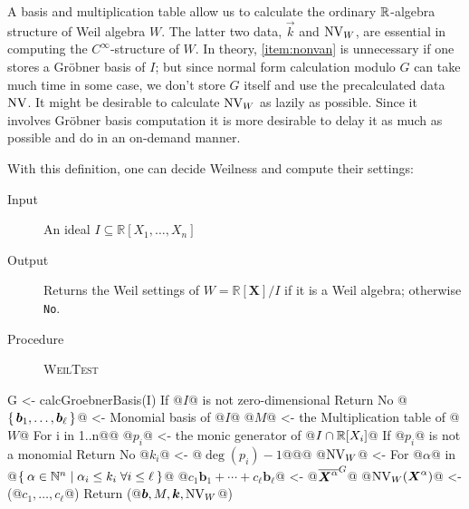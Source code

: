A basis and multiplication table allow us to calculate the ordinary $\mathbb{R}$-algebra structure of Weil algebra $W$.
The latter two data, $\vec{k}$ and $\operatorname{NV}_W$, are essential in computing the $C^\infty$-structure of $W$.
In theory, \ref{item:nonvan} is unnecessary if one stores a Gr\"{o}bner basis of $I$;
but since normal form calculation modulo $G$ can take much time in some case, we don't store $G$ itself and use the precalculated data $\operatorname{NV}$.
It might be desirable to calculate $\operatorname{NV}_W$ as lazily as possible.
Since it involves Gr\"{o}bner basis computation it is more desirable to delay it as much as possible and do in an on-demand manner.

With this definition, one can decide Weilness and compute their settings:

\begin{algorithm}\label{alg:weil-test}
  \hspace{1em}\vspace{-.25em}
  \begin{description}
    \item[Input] An ideal $I \subseteq \mathbb{R}[X_1, \dots, X_n]$
    \item[Output] Returns the Weil settings of $W = \mathbb{R}[\boldsymbol{X}]/I$ if it is a Weil algebra; otherwise \verb|No|.
    \item[Procedure] \textup{\textsc{WeilTest}}
  \end{description}

  \begin{alg}
G <- calcGroebnerBasis(I)
If @$I$@ is not zero-dimensional
  Return No
@$\set{\boldsymbol{b}_1, \dots, \boldsymbol{b}_\ell}$@ <- Monomial basis of @$I$@
@$M$@ <- the Multiplication table of @$W$@
For i in 1..n@\label{line:weil-test:radical-start}@
  @$p_i$@ <- the monic generator of @$I \cap \mathbb{R}[X_i]$@
  If @$p_i$@ is not a monomial
    Return No
  @$k_i$@ <- @$\deg(p_i) - 1$@@\label{line:weil-test:radical-end}@
@$\operatorname{NV}_W$@ <- {}
For @$\alpha$@ in @$\Set{\alpha \in \mathbb{N}^n | \alpha_i \leq k_i \; \forall i \leq \ell}$@
  @$c_1 \boldsymbol{b}_1 + \cdots + c_\ell \boldsymbol{b}_\ell$@ <- @${\overline{\boldsymbol{X}^\alpha}}^{G}$@
  @$\operatorname{NV}_W(\boldsymbol{X}^\alpha)$@ <- (@$c_1, \dots, c_\ell$@)
Return (@$\vec{\boldsymbol{b}}, M, \vec{k}, \NonVan_W$@)
\end{alg}
\end{algorithm}

